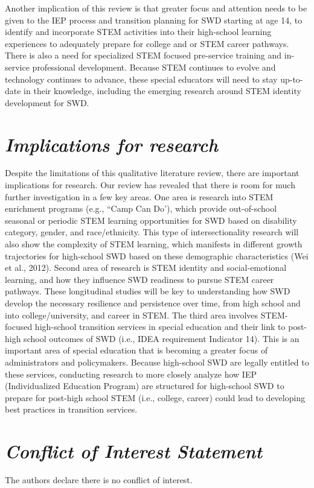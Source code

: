 \documentclass[11pt]{sig-alternate}
\begin{document}
\begin{large}
Another implication of this review is that greater focus and attention needs to be given to the IEP process and transition planning for SWD starting at age 14, to identify and incorporate STEM activities into their high-school learning experiences to adequately prepare for college and or STEM career pathways. There is also a need for specialized STEM focused pre-service training and in-service professional development. Because STEM continues to evolve and technology continues to advance, these special educators will need to stay up-to-date in their knowledge, including the emerging research around STEM identity development for SWD.   

\section*{\textit{Implications for research}}
Despite the limitations of this qualitative literature review, there are important implications for research. Our review has revealed that there is room for much further investigation in a few key areas. One area is research into STEM enrichment programs (e.g., “Camp Can Do’), which provide out-of-school seasonal or periodic STEM learning opportunities for SWD based on disability category, gender, and race/ethnicity. This type of intersectionality research will also show the complexity of STEM learning, which manifests in different growth trajectories for high-school SWD based on these demographic characteristics (Wei et al., 2012). Second area of research is STEM identity and social-emotional learning, and how they influence SWD readiness to pursue STEM career pathways. These longitudinal studies will be key to understanding how SWD develop the necessary resilience and persistence over time, from high school and into college/university, and career in STEM. The third area involves STEM-focused high-school transition services in special education and their link to post-high school outcomes of SWD (i.e., IDEA requirement Indicator 14). This is an important area of special education that is becoming a greater focus of administrators and policymakers. Because high-school SWD are legally entitled to these services, conducting research to more closely analyze how IEP (Individualized Education Program) are structured for high-school SWD to prepare for post-high school STEM (i.e., college, career) could lead to developing best practices in transition services. 

\section*{\textit{Conflict of Interest Statement}}
The authors declare there is no conflict of interest.


\end{large}
\end{document}

